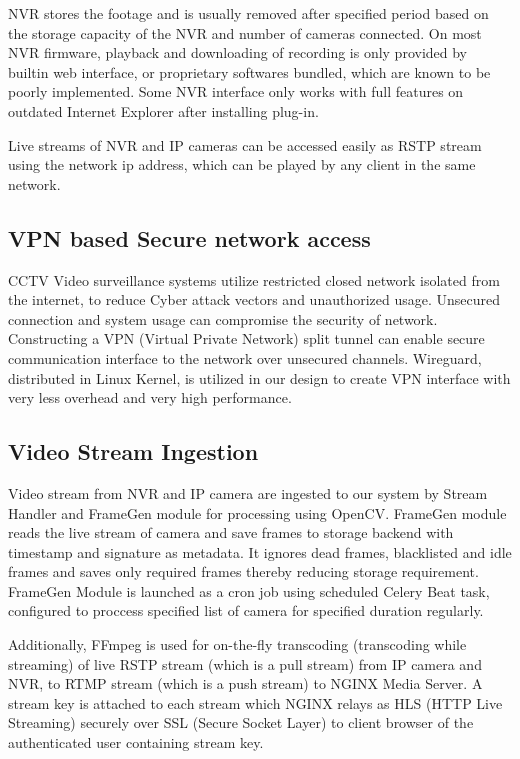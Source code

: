 NVR stores the footage and is usually removed after specified period based on the storage capacity of the NVR and number of cameras connected. On most NVR firmware, playback and downloading of recording is only provided by builtin web interface, or proprietary softwares bundled, which are known to be poorly implemented. Some NVR interface only works with full features on outdated Internet Explorer after installing plug-in.

Live streams of NVR and IP cameras can be accessed easily as RSTP stream using the network ip address, which can be played by any client in the same network.

\subsection{VPN based Secure network access}
CCTV Video surveillance systems utilize restricted closed network isolated from the internet, to reduce Cyber attack vectors and unauthorized usage. Unsecured connection and system usage can compromise the security of network. 
Constructing a VPN (Virtual Private Network) split tunnel can enable secure communication interface to the network over unsecured channels. Wireguard, distributed in Linux Kernel, is utilized in our design to create VPN interface with very less overhead and very high performance.

\subsection{Video Stream Ingestion}
Video stream from NVR and IP camera are ingested to our system by Stream Handler and FrameGen module for processing using OpenCV. FrameGen module reads the live stream of camera and save frames to storage backend with timestamp and signature as metadata. It ignores dead frames, blacklisted and idle frames and saves only required frames thereby reducing storage requirement. FrameGen Module is launched as a cron job using scheduled Celery Beat task, configured to proccess specified list of camera for specified duration regularly. 

Additionally, FFmpeg is used for on-the-fly transcoding (transcoding while streaming) of live RSTP stream (which is a pull stream) from IP camera and NVR, to RTMP stream (which is a push stream) to NGINX Media Server. A stream key is attached to each stream which NGINX relays as HLS (HTTP Live Streaming) securely over SSL (Secure Socket Layer) to client browser of the authenticated user containing stream key.   

